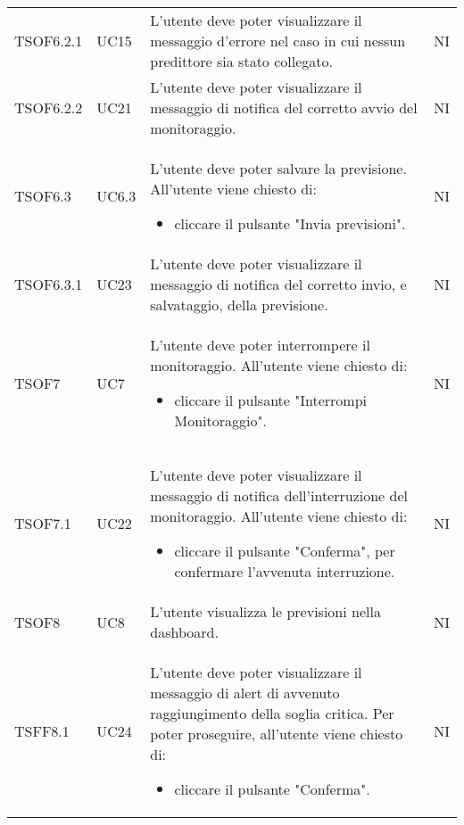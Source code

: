 \begin{longtable}{C{2.5cm} C{2.5cm} L{8cm} C{2cm}}
TSOF6.2.1 & UC15 & L'utente deve poter visualizzare il messaggio d’errore nel caso in cui nessun predittore sia stato collegato. & NI \\
TSOF6.2.2 & UC21 & L'utente deve poter visualizzare il messaggio di notifica del corretto avvio del monitoraggio. & NI \\
TSOF6.3 & UC6.3 & L'utente deve poter salvare la previsione. \newline All'utente viene chiesto di: \begin{itemize}
\item cliccare il pulsante "Invia previsioni".
\end{itemize} & NI \\
TSOF6.3.1 & UC23 & L'utente deve poter visualizzare il messaggio di notifica del corretto invio, e salvataggio, della previsione. & NI \\
TSOF7 & UC7 & L'utente deve poter interrompere il monitoraggio. \newline All'utente viene chiesto di: \begin{itemize}
\item cliccare il pulsante "Interrompi Monitoraggio".
\end{itemize} & NI \\
TSOF7.1 & UC22 & L'utente deve poter visualizzare il messaggio di notifica dell'interruzione del monitoraggio. \newline All'utente viene chiesto di: \begin{itemize}
\item cliccare il pulsante "Conferma", per confermare l'avvenuta interruzione.
\end{itemize} & NI \\
TSOF8 & UC8 & L'utente visualizza le previsioni nella dashboard. & NI \\
TSFF8.1 & UC24 & L'utente deve poter visualizzare il messaggio di alert di avvenuto raggiungimento della soglia critica. \newline Per poter proseguire, all'utente viene chiesto di: \begin{itemize}
\item cliccare il pulsante "Conferma".
\end{itemize}& NI \\


\end{longtable}